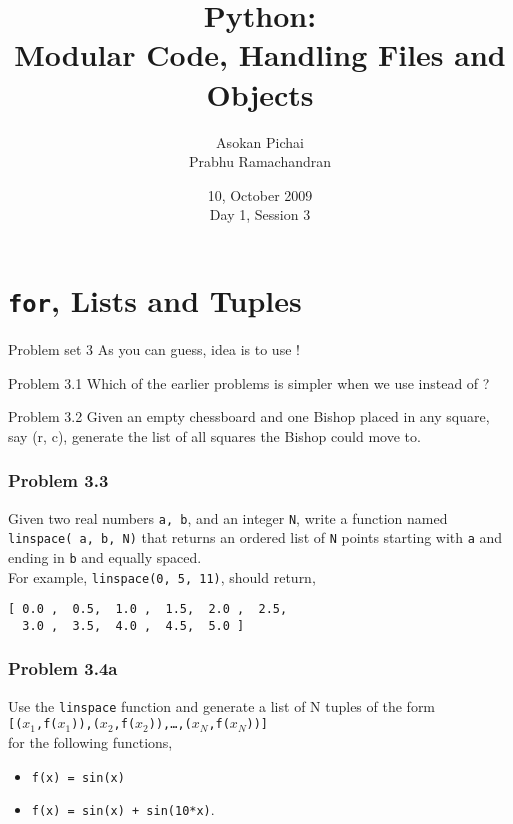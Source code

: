 \documentclass[14pt,compress]{beamer}
\title[Basic Python]{Python:\\Modular Code, Handling Files and Objects}
\author[FOSSEE Team] {Asokan Pichai\\Prabhu Ramachandran}
\institute[IIT Bombay] {Department of Aerospace Engineering\\IIT Bombay}
\date[] {10, October 2009\\Day 1, Session 3}
\newcommand{\typ}[1]{\texttt{#1}}
\newcommand{\kwrd}[1]{ \texttt{\textbf{\color{blue}{#1}}}  }
\begin{document}
\begin{frame}
  \titlepage
\end{frame}

\section{\typ{for}, Lists and Tuples}

\begin{frame}
  {Problem set 3}
  As you can guess, idea is to use \kwrd{for}!
\end{frame}

\begin{frame}{Problem 3.1}
  Which of the earlier problems is simpler when we use \kwrd{for} instead of \kwrd{while}? 
\end{frame}

\begin{frame}{Problem 3.2}
  Given an empty chessboard and one Bishop placed in any square, say (r, c), generate the list of all squares the Bishop could move to.
\end{frame}

\begin{frame}[fragile]
  \frametitle{Problem 3.3}

  Given two real numbers \typ{a, b}, and an integer \typ{N}, write a
  function named \typ{linspace( a, b, N)} that returns an ordered list
  of \typ{N} points starting with \typ{a} and ending in \typ{b} and
  equally spaced.\\

  For example, \typ{linspace(0, 5, 11)}, should return, \\
\begin{lstlisting}
[ 0.0 ,  0.5,  1.0 ,  1.5,  2.0 ,  2.5,  
  3.0 ,  3.5,  4.0 ,  4.5,  5.0 ]
\end{lstlisting}
\end{frame}

\begin{frame}[fragile]
  \frametitle{Problem 3.4a}

Use the \typ{linspace} function and generate a list of N tuples of the form\\
\typ{[($x_1$,f($x_1$)),($x_2$,f($x_2$)),\ldots,($x_N$,f($x_N$))]}\\for the following functions,\begin{itemize}
  \item \typ{f(x) = sin(x)}
  \item \typ{f(x) = sin(x) + sin(10*x)}.
\end{itemize}
\end{frame}
\end{document}
